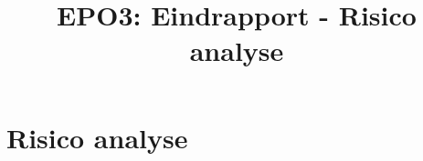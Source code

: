\documentclass{scrartcl} %
\author{}
\title{EPO3: Eindrapport - Risico analyse}
\begin{document}
\chapter{Risico analyse}
\label{ch:risico analyse}
\end{document}
